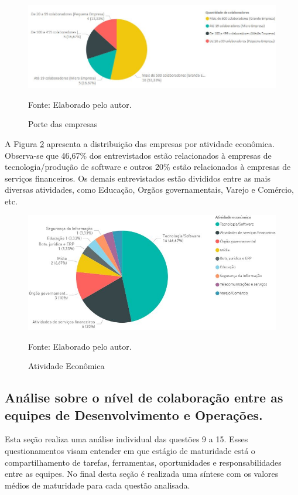 \documentclass[twoside,english,brazilian]{UNISINOSartigo}
\newcommand{\source}[1]{\caption*{Fonte: {#1}} }
\begin{document}
\begin{figure}[H]
    \centering
    \caption{Porte das empresas}
       \includegraphics[scale=.6]{imagens/colaboradores_pbi.JPG}
        \source{Elaborado pelo autor.}
     \label{fig:PorteEmpresas}
    \end{figure}

A Figura \ref{fig:colaboradores} apresenta a distribuição das empresas por atividade econômica. Observa-se que 46,67\% dos entrevistados estão relacionados à empresas de tecnologia/produção de software e outros 20\% estão relacionados à empresas de serviços financeiros. Os demais entrevistados estão divididos entre as mais diversas atividades, como Educação, Orgãos governamentais, Varejo e Comércio, etc.

\begin{figure}[H]
    \centering
    \caption{Atividade Econômica}
       \includegraphics[scale=.6]{imagens/atividadeEcon_PBI.JPG}
        \source{Elaborado pelo autor.}
    \label{fig:colaboradores}
\end{figure}


\subsection{Análise sobre o nível de colaboração entre as equipes de Desenvolvimento e Operações.}
Esta seção realiza uma análise individual das questões 9 a 15. Esses questionamentos visam entender em que estágio de maturidade está o compartilhamento de tarefas, ferramentas, oportunidades e responsabilidades entre as equipes. No final desta seção é realizada uma síntese com os valores médios de maturidade para cada questão analisada.
\end{document}
